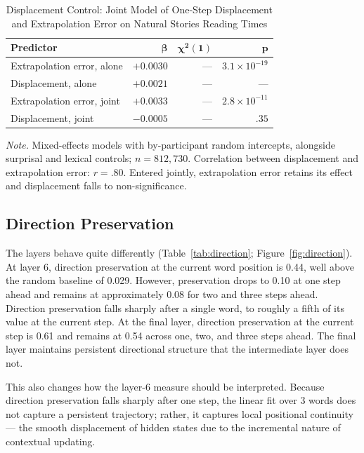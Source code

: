 \documentclass[12pt]{article}
\newcommand{\new}[1]{#1}   %
\begin{document}
\begin{table}[!htbp]
\centering
\caption{Displacement Control: Joint Model of One-Step Displacement and Extrapolation Error on Natural Stories Reading Times}
\label{tab:displacement}
\begin{tabular}{lrrr}
\toprule
\textbf{Predictor} & $\boldsymbol{\beta}$ & $\boldsymbol{\chi^2(1)}$ & $\boldsymbol{p}$ \\
\midrule
\new{Extrapolation error, alone} & \new{$+0.0030$} & \new{---} & \new{$3.1 \times 10^{-19}$} \\
\new{Displacement, alone} & \new{$+0.0021$} & \new{---} & \new{---} \\
\new{Extrapolation error, joint} & \new{$+0.0033$} & \new{---} & \new{$2.8 \times 10^{-11}$} \\
\new{Displacement, joint} & \new{$-0.0005$} & \new{---} & \new{$.35$} \\
\bottomrule
\end{tabular}

\smallskip
\footnotesize
\textit{Note.} \new{Mixed-effects models with by-participant random intercepts, alongside surprisal and lexical controls; $n = 812{,}730$. Correlation between displacement and extrapolation error: $r = .80$. Entered jointly, extrapolation error retains its effect and displacement falls to non-significance.}
\end{table}

\subsection{Direction Preservation}

The layers behave quite differently (Table~\ref{tab:direction}; Figure~\ref{fig:direction}). At layer 6, direction preservation at the current word position is 0.44, well above the random baseline of 0.029. However, preservation drops to 0.10 at one step ahead and remains at approximately 0.08 for two and three steps ahead. \new{Direction preservation falls sharply after a single word, to roughly a fifth of its value at the current step.} At the final layer, direction preservation at the current step is 0.61 and remains at 0.54 across one, two, and three steps ahead. The final layer maintains persistent directional structure that the intermediate layer does not.

This also changes how the layer-6 measure should be interpreted. \new{Because direction preservation falls sharply after one step}, the linear fit over 3 words does not capture a persistent trajectory; rather, it captures local positional continuity --- the smooth displacement of hidden states due to the incremental nature of contextual updating.
\end{document}
